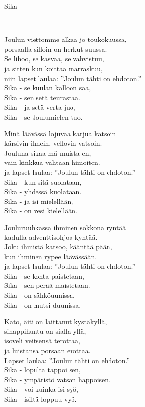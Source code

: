 \begin{song}{Sika}
	
	
	\\

    \showversenumber	
	Joulun viettomme alkaa jo toukokuussa,\\
	porsaalla silloin on herkut suussa.\\
	Se lihoo, se kasvaa, se vahvistuu,\\
	ja sitten kun koittaa marraskuu,\\
	niin lapset laulaa: ''Joulun tähti on ehdoton.''\\
	Sika - se kuulan kalloon saa,\\
	Sika - sen setä teurastaa.\\
	Sika - ja setä verta juo,\\
	Sika - se Joulumielen tuo.
	
    \showversenumber
	Minä läävässä lojuvaa karjua katsoin\\
	kärsivin ilmein, vellovin vatsoin.\\
	Jouluna sikaa mä muista en,\\
	vain kinkkua vahtaan himoiten.\\
	ja lapset laulaa: ''Joulun tähti on ehdoton.''\\
	Sika - kun sitä suolataan,\\
	Sika - yhdessä kuolataan.\\
	Sika - ja isi mielellään,\\
	Sika - on vesi kielellään.
	
    \showversenumber
	Jouluruuhkassa ihminen sokkona ryntää\\
	kadulla adventtisohjoa kyntää.\\
	Joku ihmistä katsoo, kääntää pään,\\
	kun ihminen rypee läävässään.\\
	ja lapset laulaa: ''Joulun tähti on ehdoton.''\\
	Sika - se kohta paistetaan,\\
	Sika - sen perää maistetaan.\\
	Sika - on sähköuunissa,\\
	Sika - on mutsi duunissa.
	
    \showversenumber
	Kato, äiti on laittanut kystäkyllä,\\
	sinappihuntu on sialla yllä,\\
	isoveli veitsensä terottaa,\\
	ja luistansa porsaan erottaa.\\
	Lapset laulaa: ''Joulun tähti on ehdoton.''\\
	Sika - lopulta tappoi sen,\\
	Sika - ympäristö vatsan happoisen.\\
	Sika - voi kuinka isi syö,\\
	Sika - isiltä loppuu vyö.
	

\end{song}

